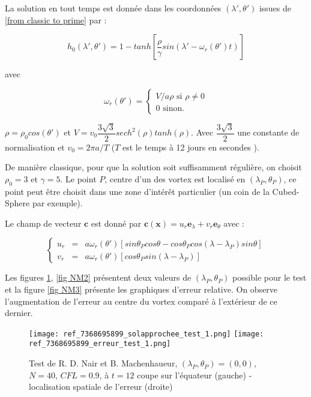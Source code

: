 La solution en tout temps est donnée dans les coordonnées $(\lambda', \theta' )$ issues de \eqref{from classic to prime} par :

\begin{equation}
\label{exact_machenhauer}
h_0(\lambda', \theta') = 1- tanh \left[ \dfrac{\rho}{\gamma} sin \left( \lambda' - \omega_r(\theta') t \right) \right]
\end{equation}

avec

\begin{equation}
\label{rotation_r}
\omega_r(\theta') = \left\lbrace
\begin{array}{ll}
V/a\rho \text{ si } \rho \neq 0\\
0 \text{ sinon.}
\end{array}
\right.
\end{equation}

$\rho = \rho_0 cos ( \theta' )$ et $V =v_0 \dfrac{3 \sqrt{3}}{2} sech^2 ( \rho )  tanh( \rho )$. Avec $\dfrac{3 \sqrt{3}}{2}$ une constante de normalisation et $v_0 = 2 \pi a / T$ ($T$ est le temps à 12 jours en secondes ).

De manière classique, pour que la solution soit suffisamment régulière, on choisit $\rho_0 = 3$ et $\gamma = 5$.
Le point $P$, centre d'un des vortex est localisé en $( \lambda_P, \theta_P)$, ce point peut être choisit dans une zone d'intérêt particulier (un coin de la Cubed-Sphere par exemple).

Le champ de vecteur $\mathbf{c}$ est donné par $\mathbf{c}( \mathbf{x} ) = u_r \mathbf{e}_{\lambda} + v_r \mathbf{e}_{\theta}$ avec :

\begin{equation}
\left\lbrace
\begin{array}{rcl}
u_r & = & a \omega_r ( \theta' ) \left[ sin \theta_P cos \theta - cos \theta_P cos( \lambda - \lambda_P ) sin \theta \right] \\
v_r & = & a \omega_r ( \theta' ) \left[ cos \theta_P sin ( \lambda - \lambda_P) \right]
\end{array}
\right.
\end{equation}

Les figures \ref{fig NM1}, \ref{fig NM2} présentent deux valeurs de $(\lambda_P, \theta_P)$ possible pour le test et la figure \ref{fig NM3} présente les graphiques d'erreur relative. On observe l'augmentation de l'erreur au centre du vortex comparé à l'extérieur de ce dernier.

\begin{figure}[ht]
\begin{center}
\texttt{[image: ref\_7368695899\_solapprochee\_test\_1.png]}
\texttt{[image: ref\_7368695899\_erreur\_test\_1.png]}
\caption{Test de R. D. Nair et B. Machenhaueur, $(\lambda_P, \theta_P) = (0,0)$, $N=40$, $CFL=0.9$, à $t=12$ coupe sur l'équateur (gauche) - localisation spatiale de l'erreur (droite)}
\label{fig NM1}
\end{center}
\end{figure}

